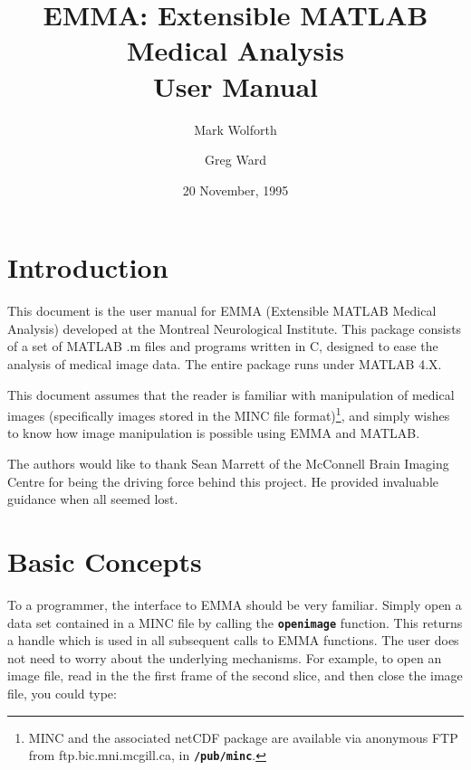 
\title{EMMA: Extensible MATLAB Medical Analysis \\ User Manual}

\author{Mark Wolforth \and Greg Ward}
\date{20 November, 1995}

\def\code#1{{\tt \bf #1}}

 

\maketitle
\newpage

\tableofcontents

\newpage
\section{Introduction}


This document is the user manual for EMMA (Extensible MATLAB Medical
Analysis) developed at the Montreal Neurological Institute.  This
package consists of a set of MATLAB .m files and programs written in
C, designed to ease the analysis of medical image data.  The entire
package runs under MATLAB 4.X.

This document assumes that the reader is familiar with manipulation of
medical images (specifically images stored in the MINC file
format)\footnote{MINC and the associated netCDF package are available
via anonymous FTP from ftp.bic.mni.mcgill.ca, in \code{/pub/minc}.},
and simply wishes to know how image manipulation is possible using EMMA
and MATLAB.

The authors would like to thank Sean Marrett of the McConnell Brain
Imaging Centre for being the driving force behind this project.  He
provided invaluable guidance when all seemed lost.

\newpage
\section{Basic Concepts}

To a programmer, the interface to EMMA should be very familiar.
Simply open a data set contained in a MINC file by calling the
\code{openimage} function.  This returns a handle which is used in all
subsequent calls to EMMA functions.  The user does not need to worry
about the underlying mechanisms.  For example, to open an image file,
read in the the first frame of the second slice, and then close the
image file, you could type:

